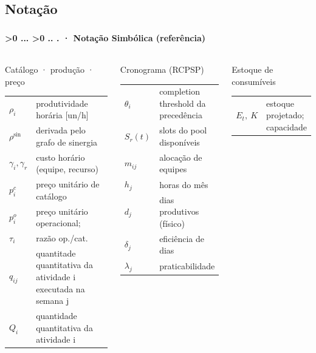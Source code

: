 \documentclass[aspectratio=169,10pt]{beamer}
\newcounter{mlc3}[subsection]
\newcounter{mlc4}[mlc3]
\newcommand{\pathnum}{%
  \ifnum\value{mlc4}>0
    \thesection.\thesubsection.\arabic{mlc3}.\arabic{mlc4}%
  \else\ifnum\value{mlc3}>0
    \thesection.\thesubsection.\arabic{mlc3}%
  \else
    \thesection.\thesubsection%
  \fi\fi
}
\newcommand{\mtitle}[1]{%
  \frametitle{\insertsection}%
  \framesubtitle{\pathnum\;·\; #1}}
\begin{document}
\subsection{Notação}
\begin{frame}
  \mtitle{Notação Simbólica (referência)}
  \scriptsize
  \begin{columns}[T]
    \begin{block}{\small Catálogo · produção · preço}
      \begin{tabular}{@{}p{1.5cm}p{4.6cm}@{}}
        $\rho_i$ & produtividade horária [un/h] \\
        $\rho^{\text{sin}}$ & derivada pelo grafo de sinergia \\
        $\gamma_i,\gamma_r$ & custo horário (equipe, recurso) \\
        $p_i^c$ & preço unitário de catálogo \\
        $p_i^o$ & preço unitário operacional; \\
        $\tau_i$ & razão op./cat. \\
        $q_{ij}$ & quantitade quantitativa da atividade i executada na semana j \\
        $Q_i$ & quantidade quantitativa da atividade i \\
      \end{tabular}
    \end{block}
    \begin{block}{\small Cronograma (RCPSP)}
      \begin{tabular}{@{}p{1.5cm}p{4.6cm}@{}}
        $\theta_i$ & completion threshold da precedência \\
        $S_r(t)$ & slots do pool disponíveis \\
        $m_{ij}$ & alocação de equipes \\
        $h_j$ & horas do mês \\
        $d_j$ & dias produtivos (físico) \\
        $\delta_j$ & eficiência de dias \\
        $\lambda_j$ & praticabilidade \\
      \end{tabular}
    \end{block}
    \begin{block}{\small Estoque de consumíveis}
      \begin{tabular}{@{}p{1.5cm}p{4.6cm}@{}}
        $E_t,\ K$ & estoque projetado; capacidade \\

\end{tabular}
\end{block}
\end{columns}
\end{frame}
\end{document}
